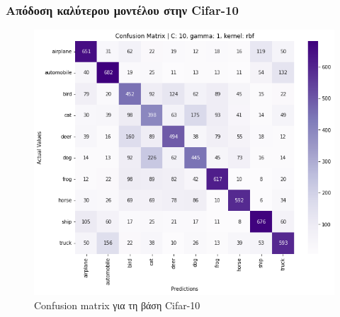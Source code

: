 \documentclass{beamer}
\begin{document}
\begin{frame}
\frametitle{Απόδοση καλύτερου μοντέλου στην Cifar-10}

\begin{figure}[H]
    \centering
    \includegraphics[width=0.6\linewidth]{figures/cifar/confusion_matrix.png}
    \caption{Confusion matrix για τη βάση Cifar-10}
    \label{fig:cifar_confusion}
\end{figure}

\end{frame}
\end{document}
